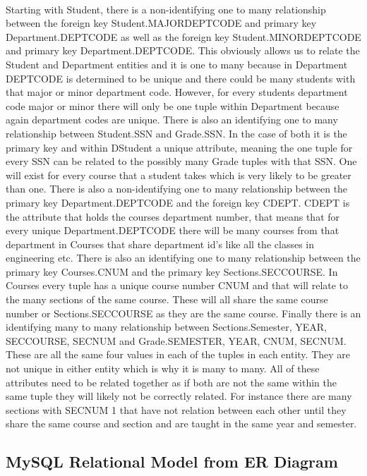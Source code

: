 \documentclass[12pt]{article}
\begin{document}
			\paragraph{}
				Starting with Student, there is a non-identifying one to many relationship between the foreign key Student.MAJORDEPTCODE and primary key Department.DEPTCODE as well as the foreign key Student.MINORDEPTCODE and primary key Department.DEPTCODE. This obviously allows us to relate the Student and Department entities and it is one to many because in Department DEPTCODE is determined to be unique and there could be many students with that major or minor department code. However, for every students department code major or minor there will only be one tuple within Department because again department codes are unique. There is also an identifying one to many relationship between Student.SSN and Grade.SSN. In the case of both it is the primary key and within DStudent a unique attribute, meaning the one tuple for every SSN can be related to the possibly many Grade tuples with that SSN. One will exist for every course that a student takes which is very likely to be greater than one. There is also a non-identifying one to many relationship between the primary key Department.DEPTCODE and the foreign key CDEPT. CDEPT is the attribute that holds the courses department number, that means that for every unique Department.DEPTCODE there will be many courses from that department in Courses that share department id's like all the classes in engineering etc. There is also an identifying one to many relationship between the primary key Courses.CNUM and the primary key Sections.SECCOURSE. In Courses every tuple has a unique course number CNUM and that will relate to the many sections of the same course. These will all share the same course number or Sections.SECCOURSE as they are the same course. Finally there is an identifying many to many relationship between Sections.{Semester, YEAR, SECCOURSE, SECNUM} and Grade.{SEMESTER, YEAR, CNUM, SECNUM}. These are all the same four values in each of the tuples in each entity. They are not unique in either entity which is why it is many to many. All of these attributes need to be related together as if both are not the same within the same tuple they will likely not be correctly related. For instance there are many sections with SECNUM 1 that have not relation between each other until they share the same course and section and are taught in the same year and semester.

		\subsection{MySQL Relational Model from ER Diagram}
\end{document}

